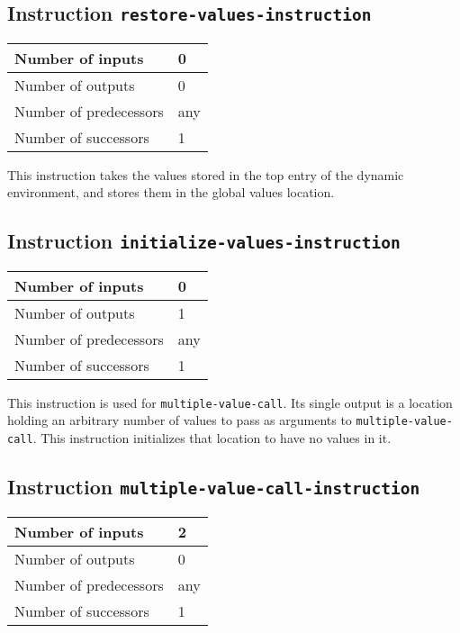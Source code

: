 \subsection{Instruction \texttt{restore-values-instruction}}
\label{hir-instruction-save-values}

\begin{tabular}{|l|l|}
  \hline
  Number of inputs & 0\\
  \hline
  Number of outputs & 0\\
  \hline
  Number of predecessors & any\\
  \hline
  Number of successors & 1\\
  \hline
\end{tabular}

This instruction takes the values stored in the top entry of the
dynamic environment, and stores them in the global values location.

\subsection{Instruction \texttt{initialize-values-instruction}}
\label{hir-instruction-save-values}

\begin{tabular}{|l|l|}
  \hline
  Number of inputs & 0\\
  \hline
  Number of outputs & 1\\
  \hline
  Number of predecessors & any\\
  \hline
  Number of successors & 1\\
  \hline
\end{tabular}

This instruction is used for \texttt{multiple-value-call}.  Its single
output is a location holding an arbitrary number of values to pass as
arguments to \texttt{multiple-value-call}.  This instruction
initializes that location to have no values in it.

\subsection{Instruction \texttt{multiple-value-call-instruction}}
\label{hir-instruction-multiple-value-call}

\begin{tabular}{|l|l|}
  \hline
  Number of inputs & 2\\
  \hline
  Number of outputs & 0\\
  \hline
  Number of predecessors & any\\
  \hline
  Number of successors & 1\\
  \hline
\end{tabular}

